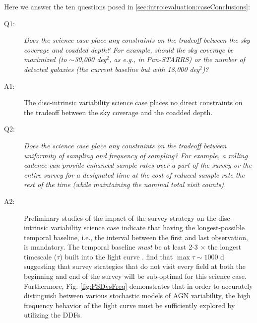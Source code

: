 Here we answer the ten questions posed in
\autoref{sec:intro:evaluation:caseConclusions}:

\begin{description}

\item[Q1:] {\it Does the science case place any constraints on the
tradeoff between the sky coverage and coadded depth? For example, should
the sky coverage be maximized (to $\sim$30,000 deg$^2$, as e.g., in
Pan-STARRS) or the number of detected galaxies (the current baseline but
with 18,000 deg$^2$)?}

\item[A1:] The disc-intrinsic variability science case places no direct
constraints on the tradeoff between the sky coverage and the coadded depth.

\item[Q2:] {\it Does the science case place any constraints on the
tradeoff between uniformity of sampling and frequency of sampling? For
example, a rolling cadence can provide enhanced sample rates over a part
of the survey or the entire survey for a designated time at the cost of
reduced sample rate the rest of the time (while maintaining the nominal
total visit counts).}

\item[A2:] Preliminary studies of the impact of the survey strategy on
the disc-intrinsic variability science case indicate that
having the longest-possible temporal baseline, i.e., the interval between
the first and last observation, is mandatory. The temporal baseline
\emph{must} be at least 2-3 $\times$ the longest timescale ($\tau$) built
into the light curve \citep{2017A&A...597A.128K}. \citet{2010ApJ...721.1014M}
find that $\max \tau \sim 1000$ d suggesting that survey strategies
that do not visit every field at both the beginning and end of the survey will
be sub-optimal for this science case.
Furthermore, Fig. \ref{fig:PSDvsFreq} demonstrates
that in order to accurately distinguish between various stochastic models of
AGN variability, the high frequency behavior of the light curve must be
sufficiently explored by utilizing the DDFs.



\end{description}
